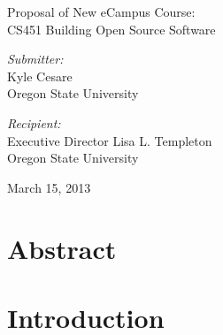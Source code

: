 \documentclass[12pt,letterpaper]{article}
\begin{document}
\begin{titlepage}
  \begin{center}
    {\LARGE Proposal of New eCampus Course:\\CS451 Building Open Source Software} \\[2cm]

    \begin{minipage}{0.4\textwidth}
      \begin{flushleft}
        \emph{Submitter:} \\
        Kyle Cesare \\
        Oregon State University \\
      \end{flushleft}
    \end{minipage}
    \begin{minipage}{0.4\textwidth}
      \begin{flushleft}
        \emph{Recipient:} \\
        Executive Director Lisa L. Templeton \\
        Oregon State University \\
      \end{flushleft}
    \end{minipage}

    \vfill

    March 15, 2013

  \end{center}
\end{titlepage}

\pagestyle{myheadings}
\setcounter{page}{2}

\setcounter{secnumdepth}{0}

\section{Abstract}

\pagebreak

\tableofcontents

\cleardoublepage
{}
\listoftables

\pagebreak


\section{Introduction}
\end{document}
